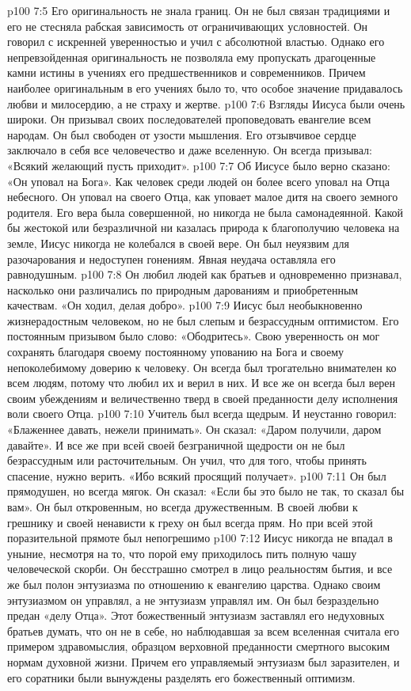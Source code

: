 \vs p100 7:5 Его оригинальность не знала границ. Он не был связан традициями и его не стесняла рабская зависимость от ограничивающих условностей. Он говорил с искренней уверенностью и учил с абсолютной властью. Однако его непревзойденная оригинальность не позволяла ему пропускать драгоценные камни истины в учениях его предшественников и современников. Причем наиболее оригинальным в его учениях было то, что особое значение придавалось любви и милосердию, а не страху и жертве.
\vs p100 7:6 Взгляды Иисуса были очень широки. Он призывал своих последователей проповедовать евангелие всем народам. Он был свободен от узости мышления. Его отзывчивое сердце заключало в себя все человечество и даже вселенную. Он всегда призывал: «Всякий желающий пусть приходит».
\vs p100 7:7 Об Иисусе было верно сказано: «Он уповал на Бога». Как человек среди людей он более всего уповал на Отца небесного. Он уповал на своего Отца, как уповает малое дитя на своего земного родителя. Его вера была совершенной, но никогда не была самонадеянной. Какой бы жестокой или безразличной ни казалась природа к благополучию человека на земле, Иисус никогда не колебался в своей вере. Он был неуязвим для разочарования и недоступен гонениям. Явная неудача оставляла его равнодушным.
\vs p100 7:8 Он любил людей как братьев и одновременно признавал, насколько они различались по природным дарованиям и приобретенным качествам. «Он ходил, делая добро».
\vs p100 7:9 Иисус был необыкновенно жизнерадостным человеком, но не был слепым и безрассудным оптимистом. Его постоянным призывом было слово: «Ободритесь». Свою уверенность он мог сохранять благодаря своему постоянному упованию на Бога и своему непоколебимому доверию к человеку. Он всегда был трогательно внимателен ко всем людям, потому что любил их и верил в них. И все же он всегда был верен своим убеждениям и величественно тверд в своей преданности делу исполнения воли своего Отца.
\vs p100 7:10 Учитель был всегда щедрым. И неустанно говорил: «Блаженнее давать, нежели принимать». Он сказал: «Даром получили, даром давайте». И все же при всей своей безграничной щедрости он не был безрассудным или расточительным. Он учил, что для того, чтобы принять спасение, нужно верить. «Ибо всякий просящий получает».
\vs p100 7:11 Он был прямодушен, но всегда мягок. Он сказал: «Если бы это было не так, то сказал бы вам». Он был откровенным, но всегда дружественным. В своей любви к грешнику и своей ненависти к греху он был всегда прям. Но при всей этой поразительной прямоте был непогрешимо 
\vs p100 7:12 Иисус никогда не впадал в уныние, несмотря на то, что порой ему приходилось пить полную чашу человеческой скорби. Он бесстрашно смотрел в лицо реальностям бытия, и все же был полон энтузиазма по отношению к евангелию царства. Однако своим энтузиазмом он управлял, а не энтузиазм управлял им. Он был безраздельно предан «делу Отца». Этот божественный энтузиазм заставлял его недуховных братьев думать, что он не в себе, но наблюдавшая за всем вселенная считала его примером здравомыслия, образцом верховной преданности смертного высоким нормам духовной жизни. Причем его управляемый энтузиазм был заразителен, и его соратники были вынуждены разделять его божественный оптимизм.
